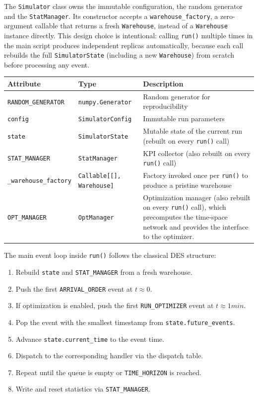 \documentclass[a4paper,10pt]{article}
\begin{document}
The \texttt{Simulator} class owns the immutable configuration, the random generator and the \texttt{StatManager}. Its constructor accepts a \texttt{warehouse\_factory}, a zero-argument callable that returns a fresh \texttt{Warehouse}, instead of a \texttt{Warehouse} instance directly. This design choice is intentional: calling \texttt{run()} multiple times in the main script produces independent replicas automatically, because each call rebuilds the full \texttt{SimulatorState} (including a new \texttt{Warehouse}) from scratch before processing any event.

\vspace{0.4em}
\begin{tabularx}{\textwidth}{l l X}
\toprule
\textbf{Attribute} & \textbf{Type} & \textbf{Description} \\
\midrule
\texttt{RANDOM\_GENERATOR}    & \texttt{numpy.Generator}          & Random generator for reproducibility \\
\texttt{config}               & \texttt{SimulatorConfig}          & Immutable run parameters \\
\texttt{state}                & \texttt{SimulatorState}           & Mutable state of the current run (rebuilt on every \texttt{run()} call) \\
\texttt{STAT\_MANAGER}        & \texttt{StatManager}              & KPI collector (also rebuilt on every \texttt{run()} call) \\
\texttt{\_warehouse\_factory} & \texttt{Callable[[], Warehouse]}  & Factory invoked once per \texttt{run()} to produce a pristine warehouse \\
\texttt{OPT\_MANAGER}         & \texttt{OptManager}               & Optimization manager (also rebuilt on every \texttt{run()} call), which precomputes the time-space network and provides the interface to the optimizer. \\
\bottomrule
\end{tabularx}

\vspace{0.4em}
The main event loop inside \texttt{run()} follows the classical DES structure:
\begin{enumerate}[noitemsep]
    \item Rebuild \texttt{state} and \texttt{STAT\_MANAGER} from a fresh warehouse.
    \item Push the first \texttt{ARRIVAL\_ORDER} event at $t \approx 0$.
    \item If optimization is enabled, push the first \texttt{RUN\_OPTIMIZER} event at  $t \approx 1 min$.
    \item Pop the event with the smallest timestamp from \texttt{state.future\_events}.
    \item Advance \texttt{state.current\_time} to the event time.
    \item Dispatch to the corresponding handler via the dispatch table.
    \item Repeat until the queue is empty or \texttt{TIME\_HORIZON} is reached.
    \item Write and reset statistics via \texttt{STAT\_MANAGER}.
\end{enumerate}
\end{document}

